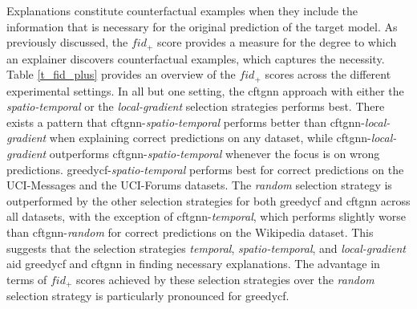 Explanations constitute counterfactual examples when they include the information that is necessary for the original prediction of the target model. As previously discussed, the $fid_+$ score provides a measure for the degree to which an explainer discovers counterfactual examples, which captures the necessity. Table \ref{t_fid_plus} provides an overview of the $fid_+$ scores across the different experimental settings. In all but one setting, the \gls{cftgnn} approach with either the \textit{spatio-temporal} or the \textit{local-gradient} selection strategies performs best. There exists a pattern that \gls{cftgnn}-\textit{spatio-temporal} performs better than \gls{cftgnn}-\textit{local-gradient} when explaining correct predictions on any dataset, while \gls{cftgnn}-\textit{local-gradient} outperforms \gls{cftgnn}-\textit{spatio-temporal} whenever the focus is on wrong predictions. \gls{greedycf}-\textit{spatio-temporal} performs best for correct predictions on the UCI-Messages and the UCI-Forums datasets. The \textit{random} selection strategy is outperformed by the other selection strategies for both \gls{greedycf} and \gls{cftgnn} across all datasets, with the exception of \gls{cftgnn}-\textit{temporal}, which performs slightly worse than \gls{cftgnn}-\textit{random} for correct predictions on the Wikipedia dataset. This suggests that the selection strategies \textit{temporal}, \textit{spatio-temporal}, and \textit{local-gradient} aid \gls{greedycf} and \gls{cftgnn} in finding necessary explanations. The advantage in terms of $fid_+$ scores achieved by these selection strategies over the \textit{random} selection strategy is particularly pronounced for \gls{greedycf}.




